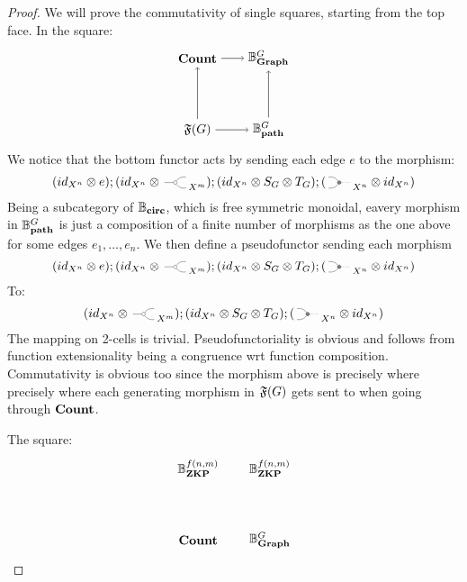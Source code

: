 \begin{proof}
  We will prove the commutativity of single squares, 
  starting from the top face. In the square:
  \begin{equation*}
    \begin{tikzpicture}
      \node (FG) at (0,0) {$\Free{G}$}; 
      \node (Count) at (0,2) {$\Count$};
      \node (BpathG) at (2,0) {$\Bpath{G}$}; 
      \node (BgraphG) at (2,2) {$\Bgraph{G}$};
      \draw[->] (FG) -- (Count);
      \draw[->] (Count) -- (BgraphG);
      \draw[->] (FG) -- (BpathG);
      \draw[->] (BpathG) -- (BgraphG);
    \end{tikzpicture}
  \end{equation*}
  We notice that the bottom functor acts by sending 
  each edge $e$ to the morphism:
  \begin{equation*}
    (\Id{X^n} \Tensor e);(\Id{X^n} \Tensor \COPYSym_{X^m});
    (\Id{X^n} \Tensor S_G \Tensor T_G);(\MATCHSym_{X^n} \Tensor \Id{X^n})
  \end{equation*}
  Being a subcategory of $\mathbb{B}_\textbf{circ}$, which is free symmetric monoidal,
  eavery morphism in $\mathbb{B}^{G}_{\textbf{path}}$ is just a composition of a finite 
  number of morphisms as the one above for some edges $e_1, \dots, e_n$.
  We then define a pseudofunctor sending each morphism 
  \begin{equation*}
    (\Id{X^n} \Tensor e);(\Id{X^n} \Tensor \COPYSym_{X^m});
    (\Id{X^n} \Tensor S_G \Tensor T_G);(\MATCHSym_{X^n} \Tensor \Id{X^n})
  \end{equation*}
  To:
  \begin{equation*}
    (\Id{X^n} \Tensor \COPYSym_{X^m});
    (\Id{X^n} \Tensor S_G \Tensor T_G);(\MATCHSym_{X^n} \Tensor \Id{X^n})
  \end{equation*}
  The mapping on 2-cells is trivial. Pseudofunctoriality 
  is obvious and follows from function extensionality
  being a congruence wrt function composition. Commutativity 
  is obvious too since the morphism above is precisely where
  precisely where each generating morphism in $\mathfrak{F}(G)$ gets sent to
  when going through $\textbf{Count}$.

  The square:
  \begin{equation*}
    \begin{tikzpicture}
      \node (Count) at (0,0) {$\Count$};
      \node (BgraphG) at (2,0) {$\Bgraph{G}$};
      \node (BpathG) at (2,2) {$\Bzkp{f(n,m)}$}; 
      \node (FG) at (0,2) {$\Bzkp{f(n,m)}$}; 


\end{tikzpicture}
\end{equation*}
\end{proof}
